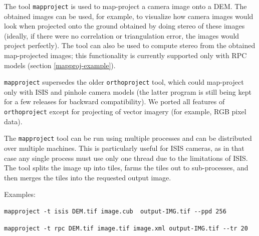 The tool \texttt{mapproject} is used to map-project a camera image onto
a DEM. The obtained images can be used, for example, to visualize how
camera images would look when projected onto the ground obtained by
doing stereo of these images (ideally, if there were no correlation or
triangulation error, the images would project perfectly). The tool can
also be used to compute stereo from the obtained map-projected images;
this functionality is currently supported only with RPC models (section
\ref{mapproj-example}).

\texttt{mapproject} supersedes the older
\texttt{orthoproject} tool, which could map-project only with ISIS and
pinhole camera models (the latter program is still being kept for a few
releases for backward compatibility). We ported all features of
\texttt{orthoproject} except for projecting of vector imagery (for
example, RGB pixel data).

The \texttt{mapproject} tool can be run using multiple processes and can be
distributed over multiple machines. This is particularly useful for
ISIS cameras, as in that case any single process must use only one thread
due to the limitations of ISIS.  The tool splits the image up into tiles,
farms the tiles out to sub-processes, and then merges the tiles into the
requested output image.

Examples:
\begin{verbatim}
mapproject -t isis DEM.tif image.cub  output-IMG.tif --ppd 256
\end{verbatim}

\begin{verbatim}
mapproject -t rpc DEM.tif image.tif image.xml output-IMG.tif --tr 20
\end{verbatim}

